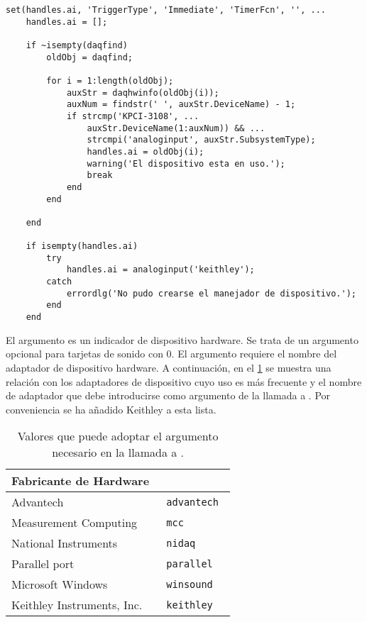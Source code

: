 \begin{lstlisting}[style=displayed, caption={[Método a seguir para crear un
	objeto dispositivo] {Método que evalúa la existencia de un objeto
	dispositivo previo a la llamada de la aplicación, en caso positivo
	lo hereda para su uso posterior, de lo contrario crea uno
	nuevo.}}, label={cod:constructor}]
	set(handles.ai, 'TriggerType', 'Immediate', 'TimerFcn', '', ...
	handles.ai = [];

	if ~isempty(daqfind)
		oldObj = daqfind;

		for i = 1:length(oldObj);
			auxStr = daqhwinfo(oldObj(i));
			auxNum = findstr(' ', auxStr.DeviceName) - 1;
			if strcmp('KPCI-3108', ...
				auxStr.DeviceName(1:auxNum)) && ...
				strcmpi('analoginput', auxStr.SubsystemType);
				handles.ai = oldObj(i);
				warning('El dispositivo esta en uso.');
				break
			end
		end

	end

	if isempty(handles.ai)
		try
			handles.ai = analoginput('keithley');
		catch
			errordlg('No pudo crearse el manejador de dispositivo.');
		end
	end
\end{lstlisting}

El argumento  es un indicador de dispositivo hardware. Se trata de
un argumento opcional para tarjetas de sonido con  0. El argumento
 requiere el nombre del adaptador de dispositivo hardware.
A continuación, en el \cref{tab:adaptors} se muestra una relación con los
adaptadores de dispositivo cuyo uso es más frecuente y el nombre de
adaptador que debe introducirse como argumento de la llamada a
. Por conveniencia se ha añadido Keithley a esta lista.

\begin{table}
	\centering
	\begin{tabular}{l >{\tt\qquad}l}
		\toprule
		\multicolumn{1}{c}{Fabricante de Hardware} %
		& \multicolumn{1}{c}{\rm Nombre de adaptador} \\
		\midrule
		Advantech & advantech \\
		\midrule
		Measurement Computing & mcc \\
		\midrule
		National Instruments & nidaq \\
		\midrule
		Parallel port & parallel \\
		\midrule
		Microsoft Windows & winsound \\
		\midrule
		Keithley Instruments, Inc. & keithley \\
		\bottomrule
	\end{tabular}
	\caption[Valores que puede adoptar el argumento
	.]{Valores que puede adoptar el argumento
	 necesario en la llamada a .}
	\label{tab:adaptors}
\end{table}


